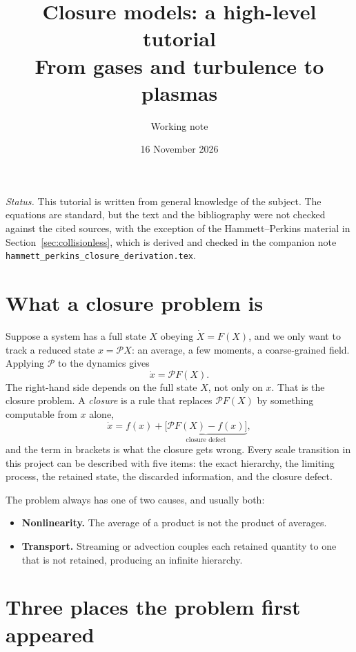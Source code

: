 \documentclass[11pt]{article}
\title{Closure models: a high-level tutorial\\[4pt]
\large From gases and turbulence to plasmas}
\author{Working note}
\date{16 November 2026}
\begin{document}
\maketitle

\noindent\emph{Status.} This tutorial is written from general knowledge of
the subject. The equations are standard, but the text and the bibliography
were not checked against the cited sources, with the exception of the
Hammett--Perkins material in Section~\ref{sec:collisionless}, which is
derived and checked in the companion note
\texttt{hammett\_perkins\_closure\_derivation.tex}.

\tableofcontents

\section{What a closure problem is}

Suppose a system has a full state $X$ obeying $\dot X = F(X)$, and we only
want to track a reduced state $x = \mathcal{P}X$: an average, a few moments,
a coarse-grained field. Applying $\mathcal{P}$ to the dynamics gives
\begin{equation}
  \dot x = \mathcal{P}F(X).
  \label{eq:unclosed}
\end{equation}
The right-hand side depends on the full state $X$, not only on $x$. That is
the closure problem. A \emph{closure} is a rule that replaces
$\mathcal{P}F(X)$ by something computable from $x$ alone,
\begin{equation}
  \dot x = f(x) + \underbrace{\bigl[\mathcal{P}F(X) - f(x)\bigr]}_{\text{closure defect}} ,
\end{equation}
and the term in brackets is what the closure gets wrong. Every scale
transition in this project can be described with five items: the exact
hierarchy, the limiting process, the retained state, the discarded
information, and the closure defect.

The problem always has one of two causes, and usually both:
\begin{itemize}
  \item \textbf{Nonlinearity.} The average of a product is not the product
    of averages.
  \item \textbf{Transport.} Streaming or advection couples each retained
    quantity to one that is not retained, producing an infinite hierarchy.
\end{itemize}

\section{Three places the problem first appeared}
\end{document}
